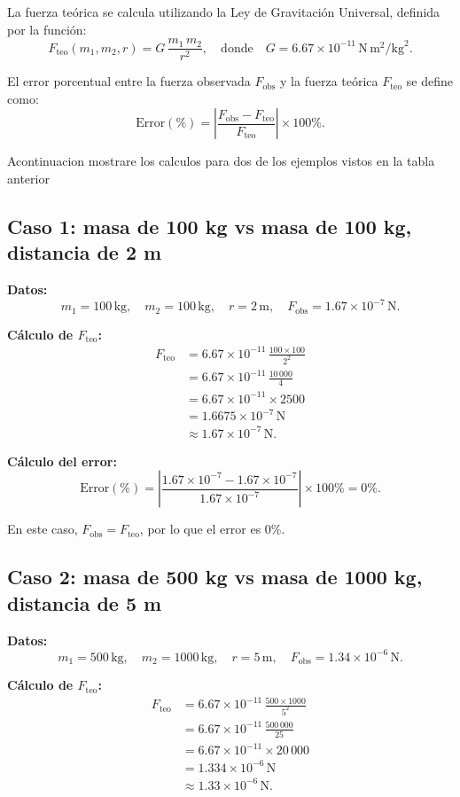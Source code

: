 \documentclass[a4paper,12pt]{article}
\begin{document}
La fuerza teórica se calcula utilizando la Ley de Gravitación Universal, definida por la función:
\[
F_{\text{teo}}(m_1, m_2, r) = G\,\frac{m_1 \, m_2}{r^2}, \quad \text{donde} \quad G = 6.67 \times 10^{-11}\,\text{N}\,\text{m}^2/\text{kg}^2.
\]

El error porcentual entre la fuerza observada \(F_{\text{obs}}\) y la fuerza teórica \(F_{\text{teo}}\) se define como:
\[
\text{Error}(\%) = \left|\frac{F_{\text{obs}} - F_{\text{teo}}}{F_{\text{teo}}}\right| \times 100\%.
\]

Acontinuacion mostrare los calculos para dos de los ejemplos vistos en la tabla anterior

\subsection*{Caso 1: masa de 100 kg vs masa de 100 kg, distancia de 2 m}

\textbf{Datos:}
\[
m_1 = 100\,\text{kg}, \quad m_2 = 100\,\text{kg}, \quad r = 2\,\text{m}, \quad F_{\text{obs}} = 1.67 \times 10^{-7}\,\text{N}.
\]

\textbf{Cálculo de \(F_{\text{teo}}\):}
\begin{align*}
F_{\text{teo}} &= 6.67 \times 10^{-11}\,\frac{100 \times 100}{2^2} \\
               &= 6.67 \times 10^{-11}\,\frac{10\,000}{4} \\
               &= 6.67 \times 10^{-11} \times 2500 \\
               &= 1.6675 \times 10^{-7}\,\text{N} \\
               &\approx 1.67 \times 10^{-7}\,\text{N}.
\end{align*}

\textbf{Cálculo del error:}
\[
\text{Error}(\%) = \left|\frac{1.67 \times 10^{-7} - 1.67 \times 10^{-7}}{1.67 \times 10^{-7}}\right| \times 100\% = 0\%.
\]

En este caso, \(F_{\text{obs}} = F_{\text{teo}}\), por lo que el error es 0\%.

\subsection*{Caso 2: masa de 500 kg vs masa de 1000 kg, distancia de 5 m}

\textbf{Datos:}
\[
m_1 = 500\,\text{kg}, \quad m_2 = 1000\,\text{kg}, \quad r = 5\,\text{m}, \quad F_{\text{obs}} = 1.34 \times 10^{-6}\,\text{N}.
\]

\textbf{Cálculo de \(F_{\text{teo}}\):}
\begin{align*}
F_{\text{teo}} &= 6.67 \times 10^{-11}\,\frac{500 \times 1000}{5^2} \\
               &= 6.67 \times 10^{-11}\,\frac{500\,000}{25} \\
               &= 6.67 \times 10^{-11} \times 20\,000 \\
               &= 1.334 \times 10^{-6}\,\text{N} \\
               &\approx 1.33 \times 10^{-6}\,\text{N}.
\end{align*}
\end{document}
